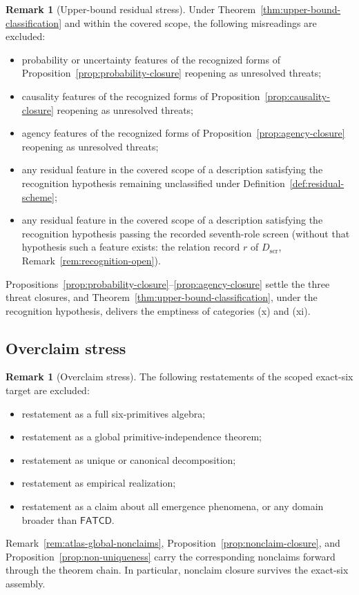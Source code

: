 \documentclass[11pt]{article}
\theoremstyle{definition}
\newtheorem{remark}[theorem]{Remark}
\newcommand{\FATCD}{\ensuremath{\mathsf{FATCD}}}
\begin{document}
\begin{remark}[Upper-bound residual stress]\label{prop:residual-stress}
Under Theorem~\ref{thm:upper-bound-classification} and within the covered
scope, the following misreadings are excluded:
\begin{itemize}[topsep=2pt,itemsep=1pt]
  \item probability or uncertainty features of the recognized forms of
    Proposition~\ref{prop:probability-closure} reopening as unresolved
    threats;
  \item causality features of the recognized forms of
    Proposition~\ref{prop:causality-closure} reopening as unresolved threats;
  \item agency features of the recognized forms of
    Proposition~\ref{prop:agency-closure} reopening as unresolved threats;
  \item any residual feature in the covered scope of a description satisfying the
    recognition hypothesis remaining unclassified under
    Definition~\ref{def:residual-scheme};
  \item any residual feature in the covered scope of a description satisfying
    the recognition hypothesis passing the recorded seventh-role screen
    (without that hypothesis such a feature exists: the relation record \(r\) of
    \(D_{\mathrm{scr}}\), Remark~\ref{rem:recognition-open}).
\end{itemize}
Propositions~\ref{prop:probability-closure}--\ref{prop:agency-closure}
settle the three threat closures, and
Theorem~\ref{thm:upper-bound-classification}, under the recognition
hypothesis, delivers the emptiness of categories (x) and (xi).
\end{remark}

\subsection{Overclaim stress}\label{subsec:overclaim-stress}

\begin{remark}[Overclaim stress]\label{prop:overclaim-stress}
The following restatements of the scoped exact-six target are
excluded:
\begin{itemize}[topsep=2pt,itemsep=1pt]
  \item restatement as a full six-primitives algebra;
  \item restatement as a global primitive-independence theorem;
  \item restatement as unique or canonical decomposition;
  \item restatement as empirical realization;
  \item restatement as a claim about all emergence phenomena, or any
    domain broader than \FATCD{}.
\end{itemize}
Remark~\ref{rem:atlas-global-nonclaims},
Proposition~\ref{prop:nonclaim-closure}, and
Proposition~\ref{prop:non-uniqueness} carry the corresponding nonclaims
forward through the theorem chain. In particular, nonclaim closure
survives the exact-six assembly.
\end{remark}
\end{document}
